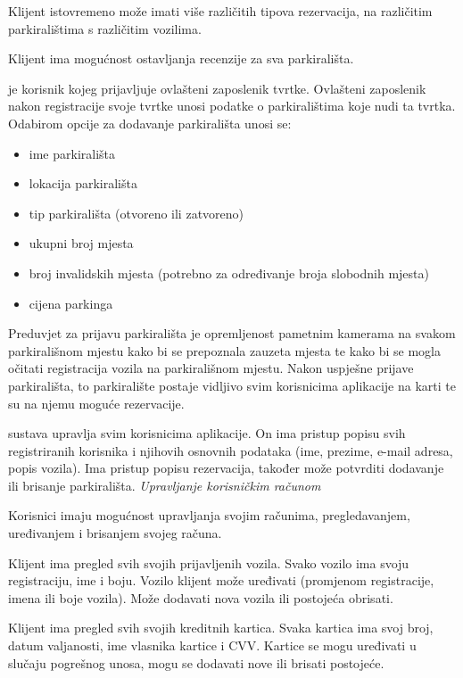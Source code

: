Klijent istovremeno može imati više različitih tipova rezervacija, na različitim parkiralištima s različitim vozilima.

Klijent ima mogućnost ostavljanja recenzije za sva parkirališta.
\newline

\textit{} je korisnik kojeg prijavljuje ovlašteni zaposlenik tvrtke. Ovlašteni zaposlenik nakon registracije svoje tvrtke unosi podatke o parkiralištima koje nudi ta tvrtka. Odabirom opcije za dodavanje parkirališta unosi se:
\begin{itemize}
    \item ime parkirališta
    \item lokacija parkirališta
    \item tip parkirališta (otvoreno ili zatvoreno)
    \item ukupni broj mjesta 
    \item broj invalidskih mjesta (potrebno za određivanje broja slobodnih mjesta)
    \item cijena parkinga
\end{itemize}
 Preduvjet za prijavu parkirališta je opremljenost pametnim kamerama na svakom parkirališnom mjestu kako bi se prepoznala zauzeta mjesta te kako bi se mogla očitati registracija vozila na parkirališnom mjestu. Nakon uspješne prijave parkirališta, to parkiralište postaje vidljivo svim korisnicima aplikacije na karti te su na njemu moguće rezervacije.
\newline

\textit{} sustava upravlja svim korisnicima aplikacije. On ima pristup popisu svih registriranih korisnika i njihovih osnovnih podataka (ime, prezime, e-mail adresa, popis vozila). Ima pristup popisu rezervacija,
također može potvrditi dodavanje ili brisanje parkirališta.
\newpage\textit{Upravljanje korisničkim računom}

Korisnici imaju mogućnost upravljanja svojim računima, pregledavanjem, uređivanjem i brisanjem svojeg računa.

Klijent ima pregled svih svojih prijavljenih vozila. Svako vozilo ima svoju registraciju, ime i boju. Vozilo klijent može uređivati (promjenom registracije, imena ili boje vozila). Može dodavati nova vozila ili postojeća obrisati. 

Klijent ima pregled svih svojih kreditnih kartica. Svaka kartica ima svoj broj, datum valjanosti, ime vlasnika kartice i CVV. Kartice se mogu uređivati u slučaju pogrešnog unosa, mogu se dodavati nove ili brisati postojeće.

